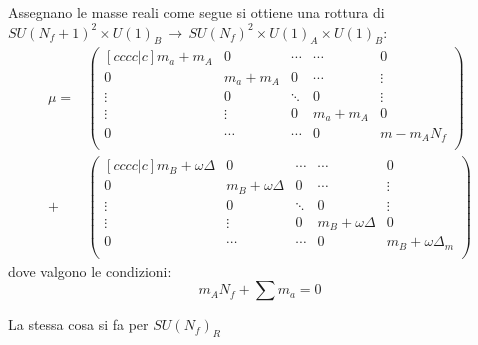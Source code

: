 \documentclass[a4paper,12pt]{report}
\begin{document}
Assegnano le masse reali come segue si ottiene una rottura di $ SU(N_f+1)^2 \times U(1)_B \, \rightarrow \, SU(N_f)^2 \times U(1)_A \times U(1)_B$:
\begin{align*}
\mu = &
\begin{pmatrix}[c c c c|c]
		m_a + m_A 	& 0 		& \cdots 	& \cdots 	& 0 \\
		0 			 & m_a + m_A & 0 &\cdots & \vdots \\
		\vdots 		& 0 		& \ddots & 0 & \vdots \\
		\vdots & \vdots & 0 & m_a + m_A & 0 \\
		\hline 
		0 & \cdots & \cdots & 0 & m  - m_A N_f\\
\end{pmatrix} \\
+ &
\begin{pmatrix}[c c c c|c]
		m_B + \omega \Delta 	& 0 		& \cdots 	& \cdots 	& 0 \\
		0 			 & m_B + \omega \Delta & 0 &\cdots & \vdots \\
		\vdots 		& 0 		& \ddots & 0 & \vdots \\
		\vdots & \vdots & 0 & m_B + \omega \Delta & 0 \\
		\hline 
		0 & \cdots & \cdots & 0 &  m_B + \omega \Delta_m\\
\end{pmatrix}
\end{align*}
dove valgono le condizioni:
$$
 m_A N_f + \sum m_a = 0  %
$$
\begin{comment}
Notare come si giunge così a:
$$
m  + \sum_a^{N_f} m_a   = tr_{SU(N_f+1)} m_i = 0 \quad \mbox{dove} \quad m = m_{N_f+1}
$$
Ottenendo così i vincoli che la rottura di $SU(N_f+1) \rightarrow SU(N_f) \times U(1)$.\\
\end{comment}
La stessa cosa si fa per $SU(N_f)_R$ \\
\end{document}
